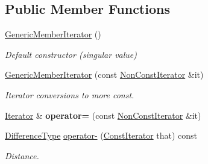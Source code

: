 \subsection*{Public Member Functions}
\begin{DoxyCompactItemize}
\item 
\hyperlink{class_generic_member_iterator_a2708717d497a0aadacdf75900de4c5b4}{Generic\+Member\+Iterator} ()
\begin{DoxyCompactList}\small\item\em Default constructor (singular value) \end{DoxyCompactList}\item 
\hyperlink{class_generic_member_iterator_a2697fd327a90654b0bf91c988e43f95e}{Generic\+Member\+Iterator} (const \hyperlink{class_generic_member_iterator_abc26eb06f2962765b11dcd06ce84ac02}{Non\+Const\+Iterator} \&it)
\begin{DoxyCompactList}\small\item\em Iterator conversions to more const. \end{DoxyCompactList}\item 
\mbox{\label{class_generic_member_iterator_a4ebb2b80e7d70c11802520ae77958df3}} 
\hyperlink{class_generic_member_iterator_ad1cf1ecf6210b47906c9f179c893a8b8}{Iterator} \& {\bfseries operator=} (const \hyperlink{class_generic_member_iterator_abc26eb06f2962765b11dcd06ce84ac02}{Non\+Const\+Iterator} \&it)
\item 
\mbox{\label{class_generic_member_iterator_ae119ae8ed78dbd980f83d367f59a3c94}} 
\hyperlink{class_generic_member_iterator_a902b99c8ae351cd7626514dc5f30740a}{Difference\+Type} \hyperlink{class_generic_member_iterator_ae119ae8ed78dbd980f83d367f59a3c94}{operator-\/} (\hyperlink{class_generic_member_iterator_ae5be27a73dce0be58ee2776db896d591}{Const\+Iterator} that) const
\begin{DoxyCompactList}\small\item\em Distance. \end{DoxyCompactList}\end{DoxyCompactItemize}
